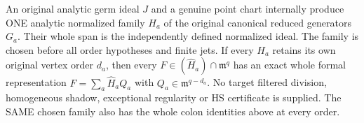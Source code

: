 \begin{theorem}
\label{hir:actual-canonical-point-normalized-strict-filtered-division}
\leanok
An original analytic germ ideal $J$ and a genuine point chart internally
produce ONE analytic normalized family $H_a$ of the original canonical
reduced generators $G_a$. Their whole span is the independently defined
normalized ideal. The family is chosen before all order hypotheses and
finite jets. If every $H_a$ retains its own original vertex order $d_a$,
then every $F\in(\widehat H_a)\cap\mathfrak m^q$ has an exact whole formal
representation $F=\sum_a\widehat H_a Q_a$ with
$Q_a\in\mathfrak m^{q-d_a}$. No target filtered division, homogeneous
shadow, exceptional regularity or HS certificate is supplied. The SAME
chosen family also has the whole colon identities above at every order.
\end{theorem}
